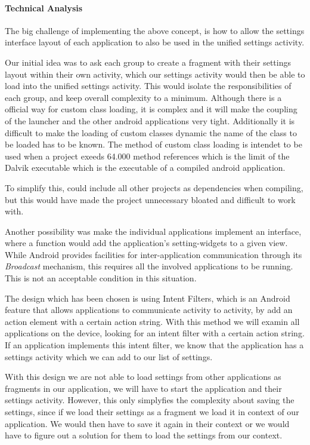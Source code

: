 \paragraph{Technical Analysis}
The big challenge of implementing the above concept, is how to allow the settings interface layout of each application to also be used in the unified settings activity. 

Our initial idea was to ask each group to create a fragment with their settings layout within their own activity, which our settings activity would then be able to load into the unified settings activity. This would isolate the responsibilities of each group, and keep overall complexity to a minimum. Although there is a official way for custom class loading\cite{customClassLoading}, it is complex and it will make the coupling of the launcher and the other android applications very tight. Additionally it is difficult to make the loading of custom classes dynamic the name of the class to be loaded has to be known. The method of custom class loading is intendet to be used when a project exeeds 64.000 method references which is the limit of the Dalvik executable which is the executable of a compiled android application.

To simplify this, \launcher could include all other projects as dependencies when compiling, but this would have made the \launcher project unnecessary bloated and difficult to work with.

Another possibility was make the individual applications implement an interface, where a function would add the application's setting-widgets to a given view. While Android provides facilities for inter-application communication through its \textit{Broadcast} mechanism\cite{broadcastReceiver}, this requires all the involved applications to be running. This is not an acceptable condition in this situation. 

The design which has been chosen is using Intent Filters\cite{intentFilter}, which is an Android feature that allows applications to communicate activity to activity, by add an action element with a certain action string.
With this method we will examin all applications on the device, looking for an intent filter with a certain action string.
If an application implements this intent filter, we know that the application has a settings activity which we can add to our list of settings.

With this design we are not able to load settings from other applications as fragments in our application, we will have to start the application and their settings activity. However, this only simplyfies the complexity about saving the settings, since if we load their settings as a fragment we load it in context of our application. We would then have to save it again in their context or we would have to figure out a solution for them to load the settings from our context.


